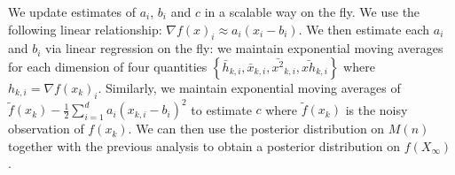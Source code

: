 \documentclass[12pt,english]{article}
\newcommand{\stedit}[1]{{\color{blue} #1}}
\begin{document}
We update estimates of $a_{i}$, $b_{i}$ and $c$ in a scalable way on the fly. We use the following linear relationship: $\nabla f\left(x\right)_{i}\approx a_{i}(x_{i}-b_{i})$. We then estimate each $a_{i}$ and $b_{i}$ via linear regression on the fly: we maintain exponential moving averages for each dimension of four quantities $\left\{ \bar{h}_{k,i},\bar{x}_{k,i},\bar{x^{2}}_{k,i},\bar{xh}_{k,i}\right\} $ where
$h_{k,i}=\nabla f\left(x_{k}\right)_{i}$. Similarly, we maintain exponential moving averages of $\tilde{f}\left(x_{k}\right)-\frac{1}{2}\sum_{i=1}^{d}a_{i}\left(x_{k,i}-b_{i}\right)^{2}$ to estimate $c$ where $\tilde{f}\left(x_{k}\right)$ is the noisy observation of $f(x_{k})$. \stedit{We can then use the posterior distribution on $M(n)$ together with the previous analysis to obtain a posterior distribution on $f(X_\infty)$.}


\end{document}
